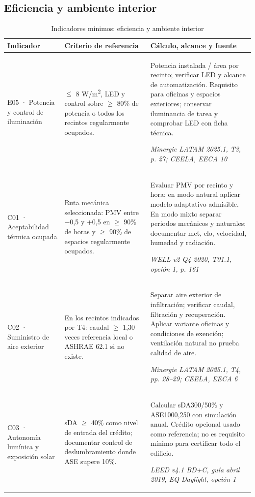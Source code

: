 \subsection{Eficiencia y ambiente interior}
\begin{table}[H]\centering\caption{Indicadores mínimos: eficiencia y ambiente interior}
{\fontsize{9.5}{12}\selectfont\singlespacing\renewcommand{\arraystretch}{1.25}\setlength{\tabcolsep}{4pt}\begin{tabular}{>{\raggedright\arraybackslash}p{2.9cm}>{\raggedright\arraybackslash}p{5.2cm}>{\raggedright\arraybackslash}p{5.9cm}}\toprule Indicador & Criterio de referencia & Cálculo, alcance y fuente \\ \midrule
E05 · Potencia y control de iluminación & $\leq$ 8 W/m\textsuperscript{2}, LED y control sobre $\geq$ 80\% de potencia o todos los recintos regularmente ocupados. & Potencia instalada / área por recinto; verificar LED y alcance de automatización. Requisito para oficinas y espacios exteriores; conservar iluminancia de tarea y comprobar LED con ficha técnica.\par\textit{Minergie LATAM 2025.1, T3, p. 27; CEELA, EECA 10} \\[4pt]
C01 · Aceptabilidad térmica ocupada & Ruta mecánica seleccionada: PMV entre $-$0,5 y +0,5 en $\geq$ 90\% de horas y $\geq$ 90\% de espacios regularmente ocupados. & Evaluar PMV por recinto y hora; en modo natural aplicar modelo adaptativo admisible. En modo mixto separar periodos mecánicos y naturales; documentar met, clo, velocidad, humedad y radiación.\par\textit{WELL v2 Q4 2020, T01.1, opción 1, p. 161} \\[4pt]
C02 · Suministro de aire exterior & En los recintos indicados por T4: caudal $\geq$ 1,30 veces referencia local o ASHRAE 62.1 si no existe. & Separar aire exterior de infiltración; verificar caudal, filtración y recuperación. Aplicar variante oficinas y condiciones de exención; ventilación natural no prueba calidad de aire.\par\textit{Minergie LATAM 2025.1, T4, pp. 28–29; CEELA, EECA 6} \\[4pt]
C03 · Autonomía lumínica y exposición solar & sDA $\geq$ 40\% como nivel de entrada del crédito; documentar control de deslumbramiento donde ASE supere 10\%. & Calcular sDA300/50\% y ASE1000,250 con simulación anual. Crédito opcional usado como referencia; no es requisito mínimo para certificar todo el edificio.\par\textit{LEED v4.1 BD+C, guía abril 2019, EQ Daylight, opción 1} \\[4pt]
\bottomrule\end{tabular}}\end{table}\par\medskip

